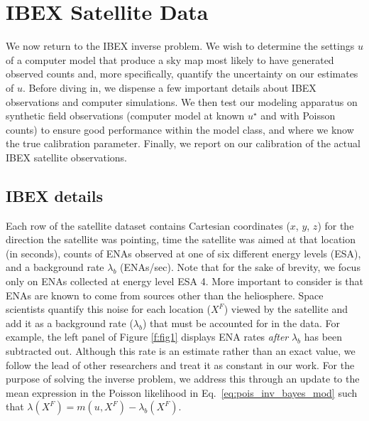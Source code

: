 \documentclass[11pt]{article}
\begin{document}

\section{IBEX Satellite Data}
\label{sec:ibex_data}

We now return to the IBEX inverse problem. We wish to determine the settings
$u$ of a computer model that produce a sky map most likely to have generated
observed counts and, more specifically, quantify the uncertainty on our
estimates of $u$. Before diving in, we dispense a few important details about
IBEX observations and computer simulations.  We then test our modeling
apparatus on synthetic field observations (computer model at known $u^\star$
and with Poisson counts) to ensure good performance within the model class,
and where we know the true calibration parameter.  Finally, we report on our
calibration of the actual IBEX satellite observations.

\subsection{IBEX details}
\label{sec:ibex_details}

Each row of the satellite dataset contains Cartesian coordinates ($x$, $y$,
$z$) for the direction the satellite was pointing, time the satellite was aimed
at that location (in seconds), counts of ENAs observed at one of six different
energy levels (ESA), and a background rate $\lambda_b$ (ENAs/sec). Note that
for the sake of brevity, we focus only on ENAs collected at energy level ESA 4.
More important to consider is that ENAs are known to come from sources other
than the heliosphere. Space scientists quantify this noise for each location
($X^F$) viewed by the satellite and add it as a background rate ($\lambda_b$)
that must be accounted for in the data. For example, the left panel of Figure
\ref{f:fig1} displays ENA rates {\em after} $\lambda_b$ has been subtracted
out. Although this rate is an estimate rather than an exact value, we follow
the lead of other researchers \citep{osthustheseus2023} and treat it as
constant in our work. For the purpose of solving the inverse problem, we
address this through an update to the mean expression in the Poisson likelihood
in Eq.~\ref{eq:pois_inv_bayes_mod} such that $\lambda(X^F) = m(u, X^F) -
\lambda_{b}(X^F)$.
\end{document}
